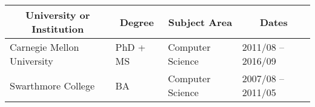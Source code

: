 \documentclass[10pt]{article}
\begin{document}
\vspace{-30pt}
\noindent\vspace{-2em}
\begin{table}[h!]
  \begin{tabular}{ p{} p{} p{} p{} }
    \toprule
    \multicolumn{1}{c}{\bf University or Institution} & \multicolumn{1}{c}{\bf Degree} & \multicolumn{1}{c}{\bf Subject Area}            & \multicolumn{1}{c}{\bf Dates} \\
    \midrule
    Carnegie Mellon University & PhD + MS & Computer Science & 2011/08 -- 2016/09 \\
    Swarthmore College         & BA       & Computer Science & 2007/08 -- 2011/05 \\
    \bottomrule
  \end{tabular}
\end{table}


\end{document}
